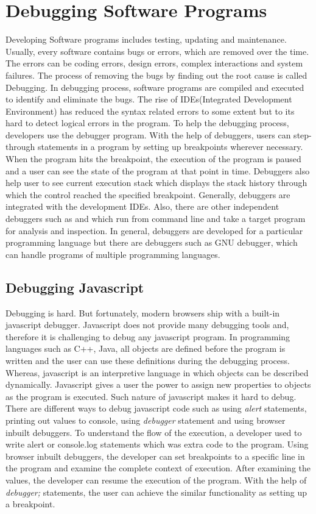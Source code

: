 \section{Debugging Software Programs}
Developing Software programs includes testing, updating and maintenance. Usually, every software contains bugs or errors, which are removed over the time. The errors can be coding errors, design errors, complex interactions and system failures. The process of removing the bugs by finding out the root cause is called Debugging. In debugging process, software programs are compiled and executed to identify and eliminate the bugs. The rise of IDEs(Integrated Development Environment) has reduced the syntax related errors to some extent but to its hard to detect logical errors in the program. To help the debugging process, developers use the debugger program. With the help of debuggers, users can step-through statements in a program by setting up breakpoints wherever necessary. When the program hits the breakpoint, the execution of the program is paused and a user can see the state of the program at that point in time. Debuggers also help user to see current execution stack which displays the stack history through which the control reached the specified breakpoint. Generally, debuggers are integrated with the development IDEs. Also, there are other independent debuggers such as \cite{oracleDebugger} and \cite{gnuDebugger} which run from command line and take a target program for analysis and inspection. In general, debuggers are developed for a particular programming language but there are debuggers such as GNU debugger\cite{gnuDebugger}, which can handle programs of multiple programming languages.

\subsection{Debugging Javascript}
Debugging is hard. But fortunately, modern browsers ship with a built-in javascript debugger. Javascript does not provide many debugging tools and, therefore it is challenging to debug any javascript program. In programming languages such as C++, Java, all objects are defined before the program is written and the user can use these definitions during the debugging process\cite{hoffman2000data}. Whereas, javascript is an interpretive language in which objects can be described dynamically. Javascript gives a user the power to assign new properties to objects as the program is executed. Such nature of javascript makes it hard to debug. There are different ways to debug javascript code such as using \textit{alert} statements, printing out values to console, using \textit{debugger} statement and using browser inbuilt debuggers. To understand the flow of the execution, a developer used to write alert or console.log statements which was extra code to the program. Using browser inbuilt debuggers, the developer can set breakpoints to a specific line in the program and examine the complete context of execution. After examining the values, the developer can resume the execution of the program. With the help of \textit{debugger;} statements, the user can achieve the similar functionality as setting up a breakpoint. 

